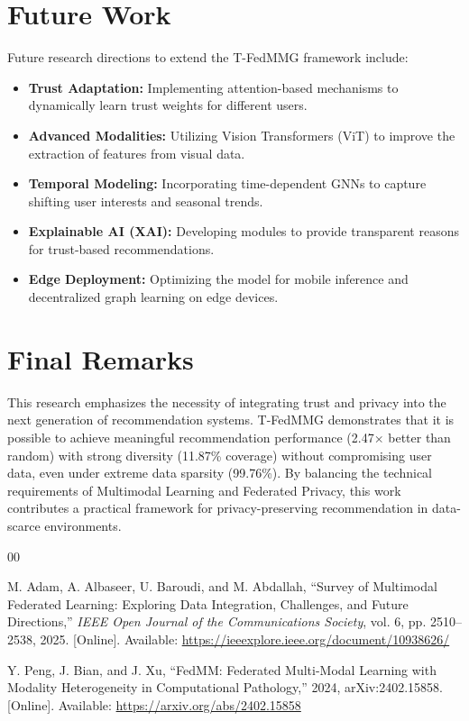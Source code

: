 \documentclass[12pt,a4paper]{report}
\begin{document}
{\section{Future Work}
Future research directions to extend the T-FedMMG framework include:
\begin{itemize}
    \item \textbf{Trust Adaptation:} Implementing attention-based mechanisms to dynamically learn trust weights for different users.
    \item \textbf{Advanced Modalities:} Utilizing Vision Transformers (ViT) to improve the extraction of features from visual data.
    \item \textbf{Temporal Modeling:} Incorporating time-dependent GNNs to capture shifting user interests and seasonal trends.
    \item \textbf{Explainable AI (XAI):} Developing modules to provide transparent reasons for trust-based recommendations.
    \item \textbf{Edge Deployment:} Optimizing the model for mobile inference and decentralized graph learning on edge devices.
\end{itemize}

\section{Final Remarks}
This research emphasizes the necessity of integrating trust and privacy into the next generation of recommendation systems. T-FedMMG demonstrates that it is possible to achieve meaningful recommendation performance (2.47$\times$ better than random) with strong diversity (11.87\% coverage) without compromising user data, even under extreme data sparsity (99.76\%). By balancing the technical requirements of Multimodal Learning and Federated Privacy, this work contributes a practical framework for privacy-preserving recommendation in data-scarce environments.
\begin{thebibliography}{00}

 M. Adam, A. Albaseer, U. Baroudi, and M. Abdallah, ``Survey of {Multimodal Federated Learning}: Exploring Data Integration, Challenges, and Future Directions,'' \textit{IEEE Open Journal of the Communications Society}, vol. 6, pp. 2510--2538, 2025. [Online]. Available: \url{https://ieeexplore.ieee.org/document/10938626/}

 Y. Peng, J. Bian, and J. Xu, ``{FedMM}: Federated Multi-Modal Learning with Modality Heterogeneity in Computational Pathology,'' 2024, arXiv:2402.15858. [Online]. Available: \url{https://arxiv.org/abs/2402.15858}


\end{thebibliography}}
\end{document}
